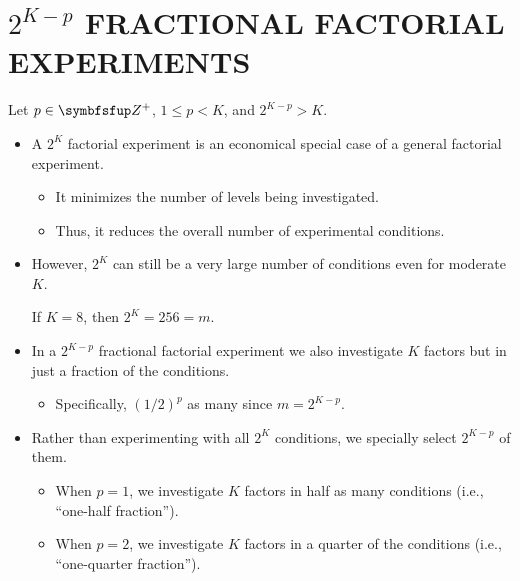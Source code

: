 \chapter{\texorpdfstring{$ 2^{K-p} $}{2K-p} FRACTIONAL FACTORIAL EXPERIMENTS}
Let $ p\in\Field{Z}^+ $, $ 1\le p<K $, and $ 2^{K-p}>K $.
\begin{itemize}[*]
      \item A $ 2^K $ factorial experiment is an economical special case of a general factorial experiment.
            \begin{itemize}[$\rightarrow$]
                  \item It minimizes the number of levels being investigated.
                  \item Thus, it reduces the overall number of experimental conditions.
            \end{itemize}
\end{itemize}
\begin{itemize}
      \item However, $ 2^K $ can still be a very large number of conditions even for moderate $ K $.
            \begin{Example}{}{}
                  If $ K=8 $, then $ 2^K=256=m $.
            \end{Example}
\end{itemize}
\begin{itemize}[*]
      \item In a $ 2^{K-p} $ fractional factorial experiment we also investigate $ K $ factors but in just a fraction of the
            conditions.
            \begin{itemize}[label={}]
                  \item Specifically, $ (1/2)^p $ as many since $ m=2^{K-p} $.
            \end{itemize}
\end{itemize}
\begin{itemize}[$\rightarrow$]
      \item Rather than experimenting with all $ 2^K $ conditions, we specially select $ 2^{K-p} $ of them.
            \begin{itemize}
                  \item When $ p=1 $, we investigate $ K $ factors in half as many conditions (i.e., ``one-half fraction'').
                  \item When $ p=2 $, we investigate $ K $ factors in a quarter of the conditions (i.e., ``one-quarter fraction'').
            \end{itemize}
\end{itemize}
